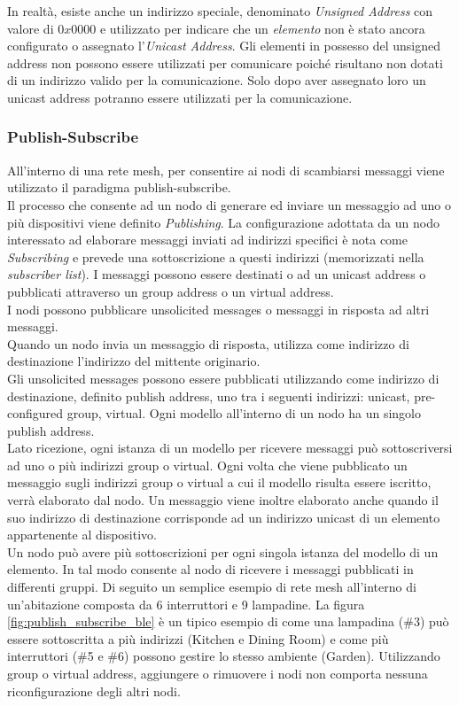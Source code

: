 \noindent In realtà, esiste anche un indirizzo speciale, denominato \textit{Unsigned Address} con valore di $0x0000$ e utilizzato per indicare che un \textit{elemento} non è stato ancora configurato o assegnato l'\textit{Unicast Address}. Gli elementi in possesso del unsigned address non possono essere utilizzati per comunicare poiché risultano non dotati di un indirizzo valido per la comunicazione. Solo dopo aver assegnato loro un unicast address potranno essere utilizzati per la comunicazione.

\subsubsection{Publish-Subscribe}
\label{subsub:publish_subscribe}
All'interno di una rete mesh, per consentire ai nodi di scambiarsi messaggi viene utilizzato il paradigma publish-subscribe.\\
Il processo che consente ad un nodo di generare ed inviare un messaggio ad uno o più dispositivi viene definito \textit{Publishing}. La configurazione adottata da un nodo interessato ad elaborare messaggi inviati ad indirizzi specifici è nota come \textit{Subscribing} e prevede una sottoscrizione a questi indirizzi (memorizzati nella \textit{subscriber list}). I messaggi possono essere destinati o ad un unicast address o pubblicati attraverso un group address o un virtual address.\\

\noindent I nodi possono pubblicare unsolicited messages o messaggi in risposta ad altri messaggi.\\
Quando un nodo invia un messaggio di risposta, utilizza come indirizzo di destinazione l'indirizzo del mittente originario.\\
Gli unsolicited messages possono essere pubblicati utilizzando come indirizzo di destinazione, definito publish address, uno tra i seguenti indirizzi: unicast, pre-configured group, virtual. Ogni modello all'interno di un nodo ha un singolo publish address.\\

\noindent Lato ricezione, ogni istanza di un modello per ricevere messaggi può sottoscriversi ad uno o più indirizzi group o virtual. Ogni volta che viene pubblicato un messaggio sugli indirizzi group o virtual a cui il modello risulta essere iscritto, verrà elaborato dal nodo. Un messaggio viene inoltre elaborato anche quando il suo indirizzo di destinazione corrisponde ad un indirizzo unicast di un elemento appartenente al dispositivo.\\
Un nodo può avere più sottoscrizioni per ogni singola istanza del modello di un elemento. In tal modo consente al nodo di ricevere i messaggi pubblicati in differenti gruppi. Di seguito un semplice esempio di rete mesh all'interno di un'abitazione composta da 6 interruttori e 9 lampadine. La figura \ref{fig:publish_subscribe_ble} è un tipico esempio di come una lampadina (\#3) può essere sottoscritta a più indirizzi (Kitchen e Dining Room) e come più interruttori (\#5 e \#6) possono gestire lo stesso ambiente (Garden). Utilizzando group o virtual address, aggiungere o rimuovere i nodi non comporta nessuna riconfigurazione degli altri nodi.


